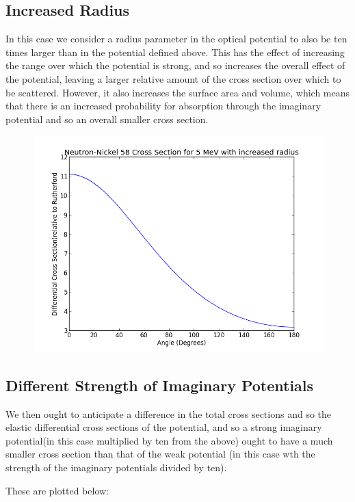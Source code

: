 \documentclass[paper=a4, fontsize=11pt]{scrartcl} %
\numberwithin{equation}{section} %
\numberwithin{figure}{section} %
\numberwithin{table}{section} %
\begin{document}
\subsection{Increased Radius}

In this case we consider a radius parameter in the optical potential to also be ten times larger than in the potential defined above. This has the effect of increasing the range over which the potential is strong, and so increases the overall effect of the potential, leaving a larger relative amount of the cross section over which to be scattered. However, it also increases the surface area and volume, which means that there is an increased probability for absorption through the imaginary potential and so an overall smaller cross section.

\begin{figure}[hbt]
\centering
\includegraphics[width=.4\textwidth]{NeutronRad.png}
\end{figure}

\subsection{Different Strength of Imaginary Potentials}

We then ought to anticipate a difference in the total cross sections and so the elastic differential cross sections of the potential, and so a strong imaginary potential(in this case multiplied by ten from the above) ought to have a much smaller cross section than that of the weak potential (in this case wth the strength of the imaginary potentials divided by ten).

These are plotted below:
\end{document}
